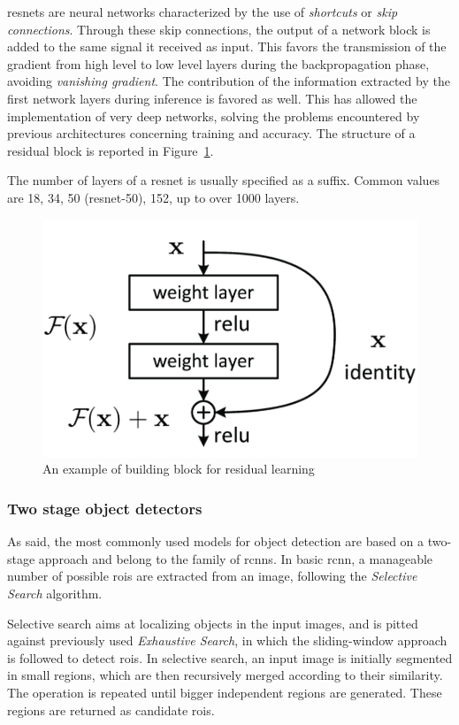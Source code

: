 \documentclass[%
    corpo=12pt,
    twoside,
    stile=classica,   
    tipotesi=magistrale,
    evenboxes,
    english,
	numerazioneromana,
]{toptesi}
\begin{document}
\Glspl{resnet} are neural networks characterized by the use of \textit{shortcuts} or \textit{skip connections}. Through these skip connections, the output of a network block is added to the same signal it received as input. This favors the transmission of the gradient from high level to low level layers during the backpropagation phase, avoiding \textit{vanishing gradient}. The contribution of the information extracted by the first network layers during inference is favored as well. This has allowed the implementation of very deep networks, solving the problems encountered by previous architectures concerning training and accuracy. The structure of a residual block is reported in Figure~\ref{fig:resnet}.

The number of layers of a \gls{resnet} is usually specified as a suffix. Common values are 18, 34, 50 (\gls{resnet}-50), 152, up to over 1000 layers\cite{he2016identity}.

\begin{figure}[ht]
	\centering
	\includegraphics[width=.5\textwidth]{imgs/resnet.png}
	\caption{An example of building block for residual learning\cite{he2015deep}}
	\label{fig:resnet}
\end{figure}

\subsubsection{Two stage object detectors}
As said, the most commonly used models for object detection are based on a two-stage approach and belong to the family of \glspl{rcnn}. In basic \gls{rcnn}\cite{girshick2014rich}, a manageable number of possible \glspl{roi} are extracted from an image, following the \textit{Selective Search} algorithm.

Selective search aims at localizing objects in the input images, and is pitted against previously used \textit{Exhaustive Search}, in which the sliding-window approach is followed to detect \glspl{roi}. In selective search, an input image is initially segmented in small regions, which are then recursively merged according to their similarity. The operation is repeated until bigger independent regions are generated. These regions are returned as candidate \glspl{roi}.
\end{document}
